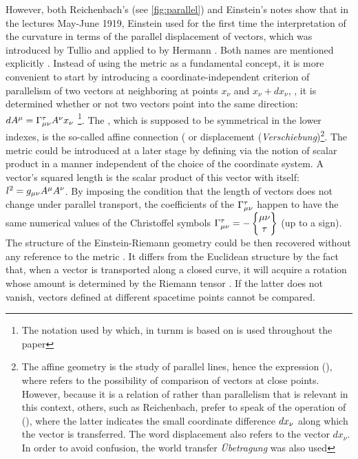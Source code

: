\documentclass[draft]{article}
\newcommand{\xdx}{\ensuremath{x_\nu} and \ensuremath{x_\nu + dx_\nu}\xspace}
\begin{document}
However, both Reichenbach's (see \cref{fig:parallel}) and Einstein's notes show that in the lectures May-June 1919, Einstein used for the first time the interpretation of the curvature in terms of the parallel displacement of vectors, which was introduced by Tullio \citet{Levi-Civita1916} and applied to \rt by Hermann \citet{Weyl1918}. Both names are mentioned explicitly \citep[028-01-03, 33]{HR}. Instead of using the metric as a fundamental concept, it is more convenient to start by introducing a coordinate-independent criterion of parallelism of two vectors at neighboring at points \xdx, \ie, it is determined whether or not two vectors point into the same direction: $dA^\mu=\Gamma^\tau_{\mu\nu} A^\nu x_\nu$ \citep[028-01-03, 33]{HR}\footnote{The notation used by \citet{Reichenbach1928} which, in turnm is based on \citet{Eddington1923,Eddington1925} is used throughout the paper}. The \Gtmn, which is supposed to be symmetrical in the lower indexes, is the so-called affine connection ( or displacement (\textit{Verschiebung})\footnote{The affine geometry is the study of parallel lines, \citet{Weyl1918b} hence the expression  (), where  refers to the possibility of comparison of vectors at close points. However, because it is a relation of  rather than parallelism that is relevant in this context, others, such as Reichenbach, prefer to speak of the operation of  (), where the latter indicates the small coordinate difference $dx_{\nu}$ along which the vector is transferred. The word displacement also refers to the vector $dx_\nu$. In order to avoid confusion, the world transfer \textit{Übetragung} was also used}. The metric could be introduced at a later stage by defining via the notion of scalar product in a manner independent of the choice of the coordinate system. A vector's squared length is the scalar product of this vector with itself: $l^2=g_{\mu\nu} A^\mu A^\nu$. By imposing the condition that the length of vectors does not change under parallel transport, the coefficients of the $\Gamma^\tau_{\mu\nu}$ happen to have the same numerical values of the Christoffel symbols $\Gamma^\tau_{\mu\nu} = - \begin{Bmatrix} \mu \nu \\ \tau \end{Bmatrix}$ (up to a sign). The structure of the Einstein-Riemann geometry could be then recovered without any reference to the metric \gmn. It differs from the Euclidean structure by the fact that, when a vector is transported along a closed curve, it will acquire a rotation whose amount is determined by the Riemann tensor \riteg. If the latter does not vanish, vectors defined at different spacetime points cannot be compared.
\end{document}
